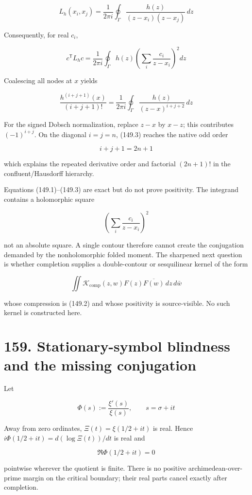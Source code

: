 \documentclass[
  11pt,
]{book}
\begin{document}
\[
\boxed{
L_h(x_i,x_j)
=\frac1{2\pi i}
\oint_\Gamma
\frac{h(z)}{(z-x_i)(z-x_j)}\,dz}
\tag{149.1}
\]

Consequently, for real \(c_i\),

\[
\boxed{
c^{\mathsf T}L_hc
=\frac1{2\pi i}
\oint_\Gamma h(z)
\left(\sum_i\frac{c_i}{z-x_i}\right)^2dz}
\tag{149.2}
\]

Coalescing all nodes at \(x\) yields

\[
\boxed{
\frac{h^{(i+j+1)}(x)}{(i+j+1)!}
=\frac1{2\pi i}
\oint_\Gamma
\frac{h(z)}{(z-x)^{i+j+2}}\,dz}
\tag{149.3}
\]

For the signed Dobsch normalization, replace \(z-x\) by \(x-z\); this
contributes \((-1)^{i+j}\). On the diagonal \(i=j=n\), (149.3) reaches
the native odd order

\[
i+j+1=2n+1
\]

which explains the repeated derivative order and factorial \((2n+1)!\)
in the confluent/Hausdorff hierarchy.

Equations (149.1)--(149.3) are exact but do not prove positivity. The
integrand contains a holomorphic square

\[
\left(\sum_i\frac{c_i}{z-x_i}\right)^2
\]

not an absolute square. A single contour therefore cannot create the
conjugation demanded by the nonholomorphic folded moment. The sharpened
next question is whether completion supplies a double-contour or
sesquilinear kernel of the form

\[
\iint
\mathcal K_{\mathrm{comp}}(z,w)
F(z)\overline{F(w)}\,dz\,d\bar w
\tag{149.4}
\]

whose compression is (149.2) and whose positivity is source-visible. No
such kernel is constructed here.

\section{159. Stationary-symbol blindness and the missing
conjugation}\label{stationary-symbol-blindness-and-the-missing-conjugation}

Let

\[
\Phi(s)
:=\frac{\xi'(s)}{\xi(s)},\qquad
s=\sigma+it
\tag{159.1}
\]

Away from zero ordinates, \(\Xi(t)=\xi(1/2+it)\) is real. Hence
\(i\Phi(1/2+it)=d(\log\Xi(t))/dt\) is real and

\[
\boxed{\Re\Phi(1/2+it)=0}
\tag{159.2}
\]

pointwise wherever the quotient is finite. There is no positive
archimedean-over-prime margin on the critical boundary; their real parts
cancel exactly after completion.
\end{document}
